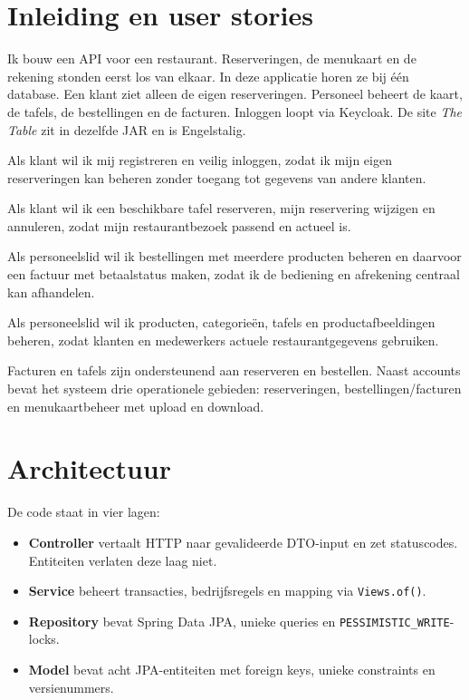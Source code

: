 \documentclass[11pt]{article}
\begin{document}

\section{Inleiding en user stories}
Ik bouw een API voor een restaurant. Reserveringen, de menukaart en de rekening
stonden eerst los van elkaar. In deze applicatie horen ze bij één database.
Een klant ziet alleen de eigen reserveringen. Personeel beheert de kaart, de
tafels, de bestellingen en de facturen. Inloggen loopt via Keycloak. De site
\emph{The Table} zit in dezelfde JAR en is Engelstalig.

\begin{description}[style=nextline,leftmargin=1.6cm]
  \item[US1] Als klant wil ik mij registreren en veilig inloggen, zodat ik mijn
    eigen reserveringen kan beheren zonder toegang tot gegevens van andere klanten.
  \item[US2] Als klant wil ik een beschikbare tafel reserveren, mijn reservering
    wijzigen en annuleren, zodat mijn restaurantbezoek passend en actueel is.
  \item[US3] Als personeelslid wil ik bestellingen met meerdere producten beheren
    en daarvoor een factuur met betaalstatus maken, zodat ik de bediening en
    afrekening centraal kan afhandelen.
  \item[US4] Als personeelslid wil ik producten, categorieën, tafels en
    productafbeeldingen beheren, zodat klanten en medewerkers actuele
    restaurantgegevens gebruiken.
\end{description}

Facturen en tafels zijn ondersteunend aan reserveren en bestellen. Naast accounts
bevat het systeem drie operationele gebieden: reserveringen, bestellingen/facturen
en menukaartbeheer met upload en download.

\section{Architectuur}
De code staat in vier lagen:

\begin{itemize}
  \item \textbf{Controller} vertaalt HTTP naar gevalideerde DTO-input en zet
        statuscodes. Entiteiten verlaten deze laag niet.
  \item \textbf{Service} beheert transacties, bedrijfsregels en mapping via
        \texttt{Views.of()}.
  \item \textbf{Repository} bevat Spring Data JPA, unieke queries en
        \texttt{PESSIMISTIC\_WRITE}-locks.
  \item \textbf{Model} bevat acht JPA-entiteiten met foreign keys, unieke
        constraints en versienummers.
\end{itemize}
\end{document}
